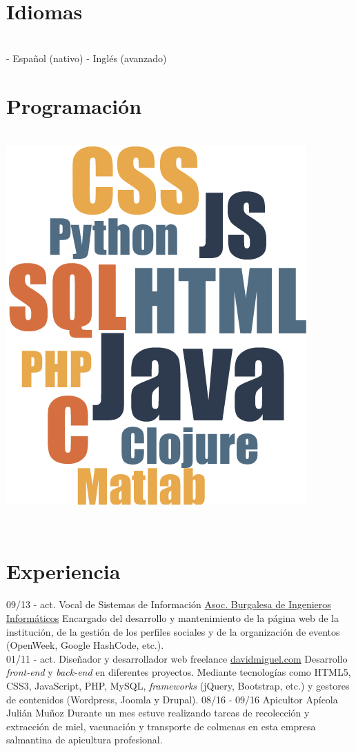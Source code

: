 \documentclass[]{friggeri-cv}
\begin{document}
\begin{aside}
  \section{Idiomas}
    \\[0.3cm]
    - Español (nativo)
    - Inglés (avanzado)
    ~       
  \section{Programación}
    \\[0.3cm]
    \includegraphics[scale=0.9]{img/cloud.png}
    ~    
\end{aside}
~
\\ [0.8cm]
\section{Experiencia}
\begin{entrylist}
    \entry
    {09/13 - act.}
    {Vocal de Sistemas de Información}
    {\href{http://abi2burgos.es/}{Asoc. Burgalesa de Ingenieros Informáticos}}
    {Encargado del desarrollo y mantenimiento de la página web de la institución, de la gestión de los perfiles sociales y de la organización de eventos (OpenWeek, Google HashCode, etc.).\\}
    \entry
    {01/11 - act.}
    {Diseñador y desarrollador web freelance}
    {\href{http://davidmiguel.com/}{davidmiguel.com}}
    {Desarrollo \textit{front-end} y \textit{back-end} en diferentes proyectos. Mediante tecnologías como HTML5, CSS3, JavaScript, PHP, MySQL, \textit{frameworks} (jQuery, Bootstrap, etc.) y gestores de contenidos (Wordpress, Joomla y Drupal).
    }
    \entry
    {08/16 - 09/16}
    {Apicultor}
    {Apícola Julián Muñoz}
    {Durante un mes estuve realizando tareas de recolección y extracción de miel, vacunación y transporte de colmenas en esta empresa salmantina de apicultura profesional.\\}
\end{entrylist}
\end{document}

